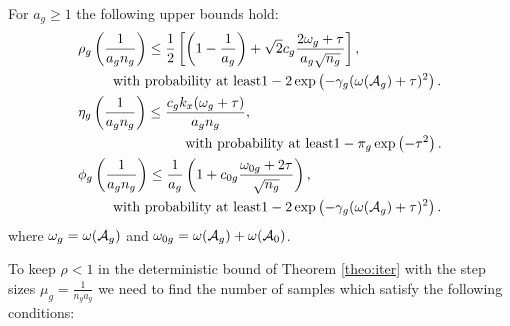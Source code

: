 	\begin{lemma}
		\label{lemm:hpub}
		For $a_g \geq 1$ the following upper bounds hold:
		\begin{align}		
		\nr 
		&\rho_g\left(\frac{1}{a_g n_g}\right) \leq \frac{1}{2}  \left[\left(1 - \frac{1}{a_g} \right) + \sqrt{2} c_g\frac{2 \omega_g + \tau}{a_g \sqrt{n_g}} \right], %
		\\ \nr 
		&\hspace*{25pt}\text{with probability at least} 1 - 2\exp\left( -\gamma_g (\omega(\cA_g) + \tau)^2  \right).
		\\ \nr 
		&\eta_g\left(\frac{1}{a_g n_g}\right) \leq \frac{c_g k_x (\omega_g + \tau)}{a_g n_g}, %
		\\ \nr 
		&\hspace*{2.7cm}\text{with probability at least} 1 - \pi_g \exp\left( -\tau^2 \right).
		\\ \nr 
		&\phi_g\left(\frac{1}{a_g n_g}\right) \leq \frac{1}{a_g}  \left(1 + c_{0g}\frac{\omega_{0g} + 2\tau}{\sqrt{n_g}} \right), %
		\\ \nr 
		&\hspace*{25pt}\text{with probability at least} 1 - 2\exp\left( -\gamma_g (\omega(\cA_g) + \tau)^2  \right).
		\end{align} 
		where $\omega_g = \omega(\cA_g)$ and $\omega_{0g} = \omega(\cA_g) + \omega(\cA_0)$.
	\end{lemma}	
	To keep $\rho < 1$ in the deterministic bound of Theorem \ref{theo:iter} with the step sizes $\mu_g = \frac{1}{n_g a_g}$ we need to find the number of samples which satisfy the following conditions:
	
